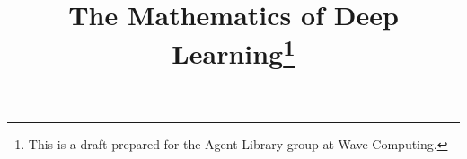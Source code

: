 \documentclass[modern]{aastex61}
\begin{document}
\title{The Mathematics of Deep Learning\footnote{This is a draft prepared for the Agent Library group at Wave Computing.}}


\end{document}
